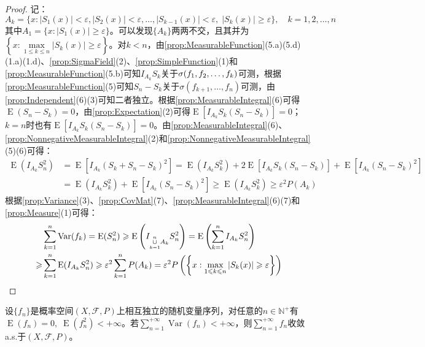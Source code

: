\begin{proof}
	记：
	\begin{equation*}
		A_k=\{x:|S_1(x)|<\varepsilon,|S_2(x)|<\varepsilon,\dots,|S_{k-1}(x)|<\varepsilon,\;|S_k(x)|\geqslant\varepsilon\},\quad k=1,2,\dots,n
	\end{equation*}
	其中$A_1=\{x:|S_1(x)|\geqslant\varepsilon\}$。可以发现$\{A_k\}$两两不交，且其并为$\left\{x:\max\limits_{1\leqslant k\leqslant n}|S_k(x)|\geqslant\varepsilon\right\}$。对$k<n$，由\cref{prop:MeasurableFunction}(5.a)(5.d)(1.a)(1.d)、\cref{prop:SigmaField}(2)、\cref{prop:SimpleFunction}(1)和\cref{prop:MeasurableFunction}(5.b)可知$I_{A_k}S_k$关于$\sigma(f_1, f_2, \dots, f_{k})$可测，根据\cref{prop:MeasurableFunction}(5)可知$S_n-S_k$关于$\sigma(f_{k+1},\dots,f_n)$可测，由\cref{prop:Independent}(6)(3)可知二者独立。根据\cref{prop:MeasurableIntegral}(6)可得$\operatorname{E}(S_n-S_k)=0$，由\cref{prop:Expectation}(2)可得$\operatorname{E}[I_{A_k}S_k(S_n-S_k)]=0$；$k=n$时也有$\operatorname{E}[I_{A_k}S_k(S_n-S_k)]=0$。由\cref{prop:MeasurableIntegral}(6)、\cref{prop:NonnegativeMeasurableIntegral}(2)和\cref{prop:NonnegativeMeasurableIntegral}(5)(6)可得：
	\begin{align*}
		\operatorname{E}(I_{A_k}S_n^2)&=\operatorname{E}[I_{A_k}(S_k+S_n-S_k)^2]=\operatorname{E}(I_{A_k}S_k^2)+2\operatorname{E}[I_{A_k}S_k(S_n-S_k)]+\operatorname{E}[I_{A_k}(S_n-S_k)^2] \\
		&=\operatorname{E}(I_{A_k}S_k^2)+\operatorname{E}[I_{A_k}(S_n-S_k)^2]\geqslant\operatorname{E}(I_{A_k}S_k^2)\geqslant\varepsilon^2P(A_k)
	\end{align*}
	根据\cref{prop:Variance}(3)、\cref{prop:CovMat}(7)、\cref{prop:MeasurableIntegral}(6)(7)和\cref{prop:Measure}(1)可得：
	\begin{align*}
		&\sum_{k=1}^{n}\operatorname{Var}(f_k)=\operatorname{E}(S_n^2)\geqslant\operatorname{E}\left(I_{\underset{k=1}{\overset{n}{\cup}}A_k}S_n^2\right)=\operatorname{E}\left(\sum_{k=1}^{n}I_{A_k}S_n^2\right) \\
		\geqslant&\sum_{k=1}^{n}\operatorname{E}(I_{A_k}S_n^2)\geqslant\varepsilon^2\sum_{k=1}^{n}P(A_k)=\varepsilon^2P\left(\left\{x:\max_{1\leqslant k\leqslant n}|S_k(x)|\geqslant\varepsilon\right\}\right)\qedhere
	\end{align*}
\end{proof}
\begin{lemma}\label{lem:KolmogorovSeries}
	设$\{f_n\}$是概率空间$(X,\mathscr{F},P)$上相互独立的随机变量序列，对任意的$n\in\mathbb{N}^+$有$\operatorname{E}(f_n)=0,\;\operatorname{E}(f_n^2)<+\infty$。若$\sum\limits_{n=1}^{+\infty}\operatorname{Var}(f_n)<+\infty$，则$\sum\limits_{n=1}^{+\infty}f_n$收敛a.s.于$(X,\mathscr{F},P)$。
\end{lemma}
